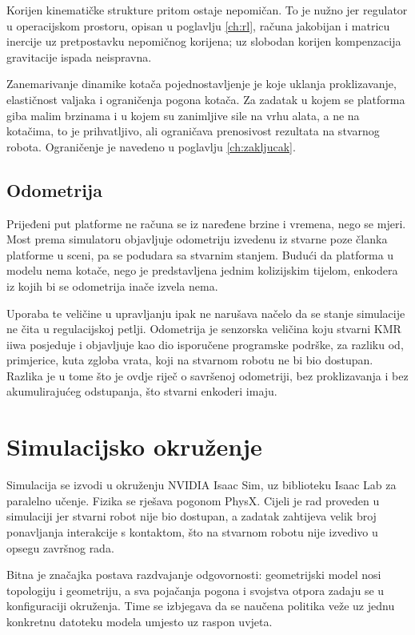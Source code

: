Korijen kinematičke strukture pritom ostaje nepomičan. To je nužno jer regulator u
operacijskom prostoru, opisan u poglavlju \ref{ch:rl}, računa jakobijan i matricu inercije uz
pretpostavku nepomičnog korijena; uz slobodan korijen kompenzacija gravitacije ispada
neispravna.

Zanemarivanje dinamike kotača pojednostavljenje je koje uklanja proklizavanje, elastičnost
valjaka i ograničenja pogona kotača. Za zadatak u kojem se platforma giba malim brzinama i u
kojem su zanimljive sile na vrhu alata, a ne na kotačima, to je prihvatljivo, ali ograničava
prenosivost rezultata na stvarnog robota. Ograničenje je navedeno u poglavlju
\ref{ch:zakljucak}.

\subsection{Odometrija}
\label{sec:odometrija}

Prijeđeni put platforme ne računa se iz naređene brzine i vremena, nego se mjeri. Most prema
simulatoru objavljuje odometriju izvedenu iz stvarne poze članka platforme u sceni, pa se
podudara sa stvarnim stanjem. Budući da platforma u modelu nema kotače, nego je predstavljena
jednim kolizijskim tijelom, enkodera iz kojih bi se odometrija inače izvela nema.

Uporaba te veličine u upravljanju ipak ne narušava načelo da se stanje simulacije ne čita u
regulacijskoj petlji. Odometrija je senzorska veličina koju stvarni KMR iiwa posjeduje i
objavljuje kao dio isporučene programske podrške, za razliku od, primjerice, kuta zgloba vrata,
koji na stvarnom robotu ne bi bio dostupan. Razlika je u tome što je ovdje riječ o savršenoj
odometriji, bez proklizavanja i bez akumulirajućeg odstupanja, što stvarni enkoderi imaju.

\section{Simulacijsko okruženje}
\label{sec:isaac}

Simulacija se izvodi u okruženju NVIDIA Isaac Sim, uz biblioteku Isaac Lab
\cite{isaaclab} za paralelno učenje. Fizika se rješava pogonom PhysX. Cijeli je rad proveden u
simulaciji jer stvarni robot nije bio dostupan, a zadatak zahtijeva velik broj ponavljanja
interakcije s kontaktom, što na stvarnom robotu nije izvedivo u opsegu završnog rada.

Bitna je značajka postava razdvajanje odgovornosti: geometrijski model nosi topologiju i
geometriju, a sva pojačanja pogona i svojstva otpora zadaju se u konfiguraciji okruženja. Time
se izbjegava da se naučena politika veže uz jednu konkretnu datoteku modela umjesto uz raspon
uvjeta.

